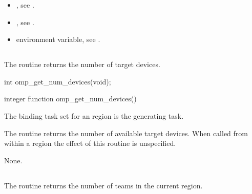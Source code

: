 \crossreferences
\begin{itemize}
\item {}, see 
.

\item {}, see 
.

\item {} environment variable, see 
. 
\end{itemize}











\subsection{}
\label{subsec:omp_get_num_devices}
\summary
The  routine returns the number of target devices.

\format
\ccppspecificstart
\begin{boxedcode}
int omp\_get\_num\_devices(void);
\end{boxedcode}
\ccppspecificend

\fortranspecificstart
\begin{boxedcode}
integer function omp\_get\_num\_devices()
\end{boxedcode}
\fortranspecificend

\binding
The binding task set for an  region is the generating task.

\effect
The  routine returns the number of available target devices. 
When called from within a  region the effect of this routine is unspecified.

\crossreferences
None.










\subsection{}
\label{subsec:omp_get_num_teams}
\summary
The  routine returns the number of teams in the current  
region.

